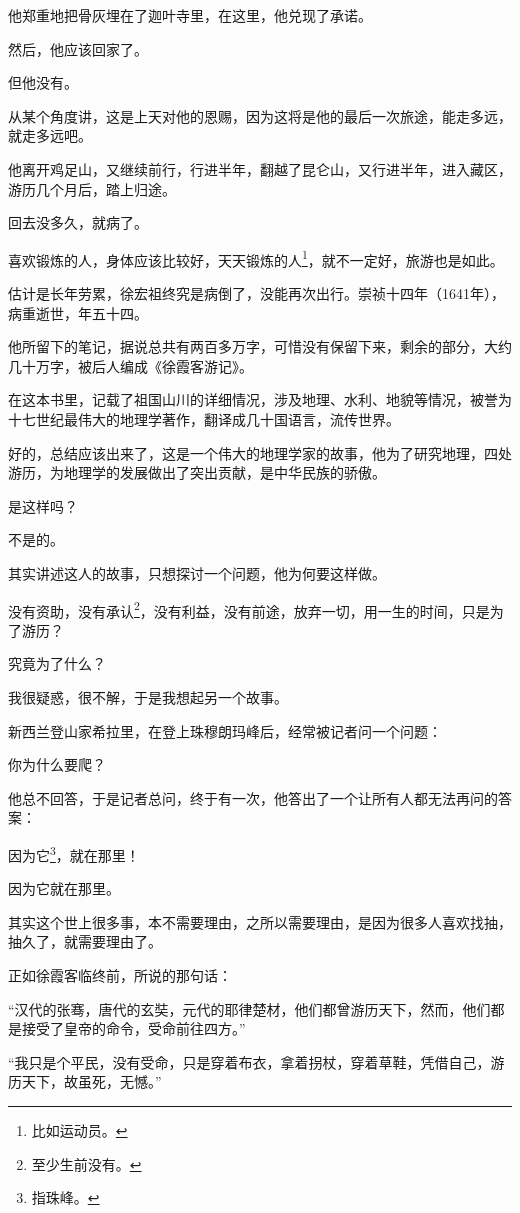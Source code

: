 \begin{multicols}{\theparacolNo}
		他郑重地把骨灰埋在了迦叶寺里，在这里，他兑现了承诺。

		然后，他应该回家了。

		但他没有。

		从某个角度讲，这是上天对他的恩赐，因为这将是他的最后一次旅途，能走多远，就走多远吧。

		他离开鸡足山，又继续前行，行进半年，翻越了昆仑山，又行进半年，进入藏区，游历几个月后，踏上归途。

		回去没多久，就病了。

		喜欢锻炼的人，身体应该比较好，天天锻炼的人\footnote{比如运动员。}，就不一定好，旅游也是如此。

		估计是长年劳累，徐宏祖终究是病倒了，没能再次出行。崇祯十四年（1641年），病重逝世，年五十四。

		他所留下的笔记，据说总共有两百多万字，可惜没有保留下来，剩余的部分，大约几十万字，被后人编成《徐霞客游记》。

		在这本书里，记载了祖国山川的详细情况，涉及地理、水利、地貌等情况，被誉为十七世纪最伟大的地理学著作，翻译成几十国语言，流传世界。

		好的，总结应该出来了，这是一个伟大的地理学家的故事，他为了研究地理，四处游历，为地理学的发展做出了突出贡献，是中华民族的骄傲。

		是这样吗？

		不是的。

		其实讲述这人的故事，只想探讨一个问题，他为何要这样做。

		没有资助，没有承认\footnote{至少生前没有。}，没有利益，没有前途，放弃一切，用一生的时间，只是为了游历？

		究竟为了什么？

		我很疑惑，很不解，于是我想起另一个故事。

		新西兰登山家希拉里，在登上珠穆朗玛峰后，经常被记者问一个问题：

		你为什么要爬？

		他总不回答，于是记者总问，终于有一次，他答出了一个让所有人都无法再问的答案：

		因为它\footnote{指珠峰。}，就在那里！

		因为它就在那里。

		其实这个世上很多事，本不需要理由，之所以需要理由，是因为很多人喜欢找抽，抽久了，就需要理由了。

		正如徐霞客临终前，所说的那句话：

		“汉代的张骞，唐代的玄奘，元代的耶律楚材，他们都曾游历天下，然而，他们都是接受了皇帝的命令，受命前往四方。”

		“我只是个平民，没有受命，只是穿着布衣，拿着拐杖，穿着草鞋，凭借自己，游历天下，故虽死，无憾。”


\end{multicols}
